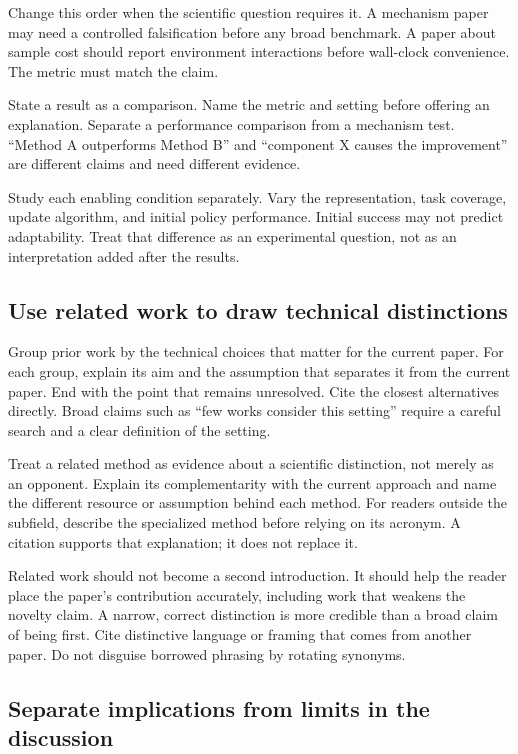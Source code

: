 Change this order when the scientific question requires it. A mechanism paper
may need a controlled falsification before any broad benchmark. A paper about
sample cost should report environment interactions before wall-clock
convenience. The metric must match the claim.

State a result as a comparison. Name the metric and setting before offering an
explanation. Separate a performance comparison from a mechanism test.
``Method A outperforms Method B'' and ``component X causes the improvement''
are different claims and need different evidence.

Study each enabling condition separately. Vary the representation, task
coverage, update algorithm, and initial policy performance. Initial success
may not predict adaptability. Treat that difference as an experimental
question, not as an interpretation added after the results.

\subsection{Use related work to draw technical distinctions}

Group prior work by the technical choices that matter for the current paper.
For each group, explain its aim and the assumption that separates it from the
current paper. End with the point that remains unresolved. Cite the closest
alternatives directly. Broad claims such as ``few works consider this
setting'' require a careful search and a clear definition of the setting.

Treat a related method as evidence about a scientific distinction, not merely
as an opponent. Explain its complementarity with the current approach and name
the different resource or assumption behind each method. For readers outside
the subfield, describe the specialized method before relying on its acronym. A
citation supports that explanation; it does not replace it.

Related work should not become a second introduction. It should help the reader
place the paper's contribution accurately, including work that weakens the
novelty claim. A narrow, correct distinction is more credible than a broad
claim of being first. Cite distinctive language or framing that comes from
another paper. Do not disguise borrowed phrasing by rotating synonyms.

\subsection{Separate implications from limits in the discussion}

